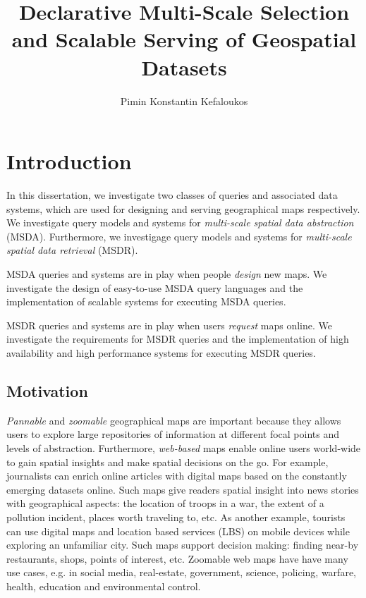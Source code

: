 \documentclass[11pt, oneside]{report}   	%
\title{Declarative Multi-Scale Selection and Scalable Serving of Geospatial Datasets}
\author{Pimin Konstantin Kefaloukos}
\begin{document}
\maketitle

\tableofcontents

\chapter{Introduction}

In this dissertation, we investigate two classes of queries and associated data systems, which are used for designing and serving geographical maps respectively. We investigate query models and systems for \emph{multi-scale spatial data abstraction} (MSDA). Furthermore, we investigage query models and systems for \emph{multi-scale spatial data retrieval} (MSDR).

MSDA queries and systems are in play when people \emph{design} new maps. We investigate the design of easy-to-use MSDA query languages and the implementation of scalable systems for executing MSDA queries.

MSDR queries and systems are in play when users \emph{request} maps online. We investigate the requirements for MSDR queries and the implementation of high availability and high performance systems for executing MSDR queries. 


\section{Motivation}
\emph{Pannable} and \emph{zoomable} geographical maps are important because they allows users to explore large repositories of information at different focal points and levels of abstraction. Furthermore, \emph{web-based} maps enable online users world-wide to gain spatial insights and make spatial decisions on the go. For example, journalists can enrich online articles with digital maps based on the constantly emerging datasets online. Such maps give readers spatial insight into news stories with geographical aspects: the location of troops in a war, the extent of a pollution incident, places worth traveling to, etc. As another example, tourists can use digital maps and location based services (LBS) on mobile devices while exploring an unfamiliar city. Such maps support decision making: finding near-by restaurants, shops, points of interest, etc. Zoomable web maps have have many use cases, e.g. in social media, real-estate, government, science, policing, warfare, health, education and environmental control.%
\end{document}
